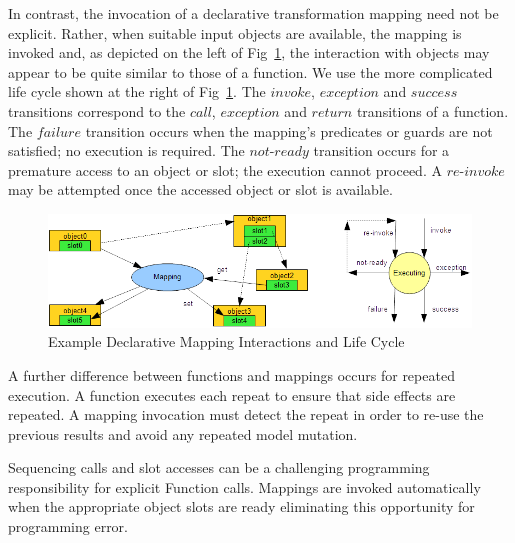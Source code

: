 \documentclass{llncs}
\begin{document}
In contrast, the invocation of a declarative transformation mapping need not be explicit. Rather, when suitable input objects are available, the mapping is invoked and, as depicted on the left of Fig~\ref{fig:MappingContext}, the interaction with objects may appear to be quite similar to those of a function. We use the more complicated life cycle shown at the right of Fig~\ref{fig:MappingContext}. The $invoke$, $exception$ and $success$ transitions correspond to the $call$, $exception$ and $return$ transitions of a function. The $failure$ transition occurs when the mapping's predicates or guards are not satisfied; no execution is required. The $not$-$ready$ transition occurs for a premature access to an object or slot; the execution cannot proceed. A $re$-$invoke$ may be attempted once the accessed object or slot is available.

\begin{figure}
	\begin{center}
		\includegraphics[width=4.5in]{MappingContext.png}
	\end{center}
	\caption{Example Declarative Mapping Interactions and Life Cycle}
	\label{fig:MappingContext}
\end{figure}



A further difference between functions and mappings occurs for repeated execution. A function executes each repeat to ensure that side effects are repeated. A mapping invocation must detect the repeat in order to re-use the previous results and avoid any repeated model mutation.

Sequencing calls and slot accesses can be a challenging programming responsibility for explicit Function calls. Mappings are invoked automatically when the appropriate object slots are ready eliminating this opportunity for programming error.
\end{document}
